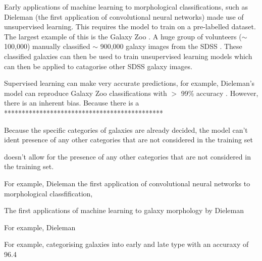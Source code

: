 \documentclass[12pt, onecolumn]{article}
\begin{document}
        Early applications of machine learning to morphological classifications, such as Dieleman \cite{first_ml_galaxy_application} (the first application of convolutional neural networks) made use of unsupervised learning. This requires the model to train on a pre-labelled dataset. The largest example of this is the Galaxy Zoo \cite{gal_zoo_original}. A huge group of volunteers ($\sim$ 100,000) manually classified $\sim$ 900,000 galaxy images from the SDSS \cite{gal_zoo_no_galaxies}. These classified galaxies can then be used to train unsupervised learning models which can then be applied to catagorise other SDSS galaxy images.

        Supervised learning can make very accurate predictions, for example, Dieleman's model can reproduce Galaxy Zoo classifications with $>$ 99\% accuracy \cite{first_ml_galaxy_application}. However, there is an inherent bias. Because there is a *********************************************




        
        
        Because the specific categories of galaxies are already decided,  the model can't ident presence of any other categories that are not considered in the training set 
        
        
        doesn't allow for the presence of any other categories that are not considered in the training set.
        
        For example, Dieleman  the first application of convolutional neural networks to morphological classfification, 
        
        The first applications of machine learning to galaxy morphology by Dieleman \cite{}

        For example, Dieleman 
        
        For example, categorising galaxies into early and late type with an accuraxy of 96.4%

        
        

\end{document}
